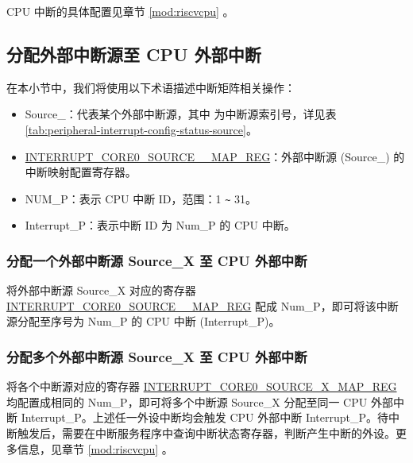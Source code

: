 \documentclass[main\_\_CN.tex]{subfiles}
\begin{document}
\begin{tiplisting}
CPU 中断的具体配置见章节 \ref{mod:riscvcpu} \textit{}。
\end{tiplisting}


\subsection{分配外部中断源至 CPU 外部中断}

在本小节中，我们将使用以下术语描述中断矩阵相关操作：
\begin{itemize}

\item Source\_：代表某个外部中断源，其中  为中断源索引号，详见表 \ref{tab:peripheral-interrupt-config-status-source}。

\item \hyperref[regdesc:INTERRUPTCORE0PIFPMSMONITORVIOLATESIZEINTRMAPREG]{INTERRUPT\_CORE0\_SOURCE\_\_MAP\_REG}：外部中断源 (Source\_) 的中断映射配置寄存器。
\item NUM\_P：表示 CPU 中断 ID，范围：1 \verb+~+ 31。
\item Interrupt\_P：表示中断 ID 为 Num\_P 的 CPU 中断。
\end{itemize}

\subsubsection{分配一个外部中断源 Source\_X 至 CPU 外部中断}

将外部中断源 Source\_X 对应的寄存器 \hyperref[regdesc:INTERRUPTCORE0PIFPMSMONITORVIOLATESIZEINTRMAPREG]{INTERRUPT\_CORE0\_SOURCE\_\_MAP\_REG} 配成 Num\_P，即可将该中断源分配至序号为 Num\_P 的 CPU 中断 (Interrupt\_P)。

\subsubsection{分配多个外部中断源 Source\_X 至 CPU 外部中断}

将各个中断源对应的寄存器 \hyperref[regdesc:INTERRUPTCORE0PIFPMSMONITORVIOLATESIZEINTRMAPREG]{INTERRUPT\_CORE0\_SOURCE\_X\_MAP\_REG} 均配置成相同的 Num\_P，即可将多个中断源 Source\_X 分配至同一 CPU 外部中断 Interrupt\_P。上述任一外设中断均会触发 CPU 外部中断 Interrupt\_P。待中断触发后，需要在中断服务程序中查询中断状态寄存器，判断产生中断的外设。更多信息，见章节 \ref{mod:riscvcpu} \textit{}。
\end{document}
